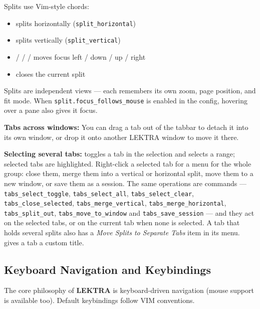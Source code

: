 \documentclass[a4paper,12pt]{article}
\begin{document}
Splits use Vim-style  chords:
\begin{itemize}[leftmargin=*]
    \item {} splits horizontally (\texttt{split\_\allowbreak{}horizontal})
    \item {} splits vertically (\texttt{split\_\allowbreak{}vertical})
    \item {} /  /  /  moves focus left / down / up / right
    \item {} closes the current split
\end{itemize}

Splits are independent views — each remembers its own zoom, page position, and fit mode. When \texttt{split.focus\_\allowbreak{}follows\_\allowbreak{}mouse} is enabled in the config, hovering over a pane also gives it focus.

\textbf{Tabs across windows:} You can drag a tab out of the tabbar to detach it into its own window, or drop it onto another LEKTRA window to move it there.

\textbf{Selecting several tabs:}  toggles a tab in the selection and  selects a range; selected tabs are highlighted. Right-click a selected tab for a menu for the whole group: close them, merge them into a vertical or horizontal split, move them to a new window, or save them as a session. The same operations are commands --- \texttt{tabs\_\allowbreak{}select\_\allowbreak{}toggle}, \texttt{tabs\_\allowbreak{}select\_\allowbreak{}all}, \texttt{tabs\_\allowbreak{}select\_\allowbreak{}clear}, \texttt{tabs\_\allowbreak{}close\_\allowbreak{}selected}, \texttt{tabs\_\allowbreak{}merge\_\allowbreak{}vertical}, \texttt{tabs\_\allowbreak{}merge\_\allowbreak{}horizontal}, \texttt{tabs\_\allowbreak{}split\_\allowbreak{}out}, \texttt{tabs\_\allowbreak{}move\_\allowbreak{}to\_\allowbreak{}window} and \texttt{tabs\_\allowbreak{}save\_\allowbreak{}session} --- and they act on the selected tabs, or on the current tab when none is selected. A tab that holds several splits also has a \textit{Move Splits to Separate Tabs} item in its menu.  gives a tab a custom title.

\subsection{Keyboard Navigation and Keybindings}

The core philosophy of \textbf{LEKTRA} is keyboard-driven navigation (mouse support is available too). Default keybindings follow VIM conventions.
\end{document}
